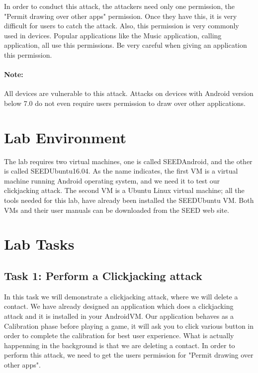 In order to conduct this attack, the attackers need only one permission, the "Permit drawing over other apps" permission.
Once they have this, it is very difficult for users to catch the attack. Also, this permission is very commonly used in devices. 
Popular applications like the Music application, calling application, all use this permissions. Be very careful when giving an 
application this permission.

\paragraph{Note:} All devices are vulnerable to this attack. Attacks on devices with Android version below 7.0 do not even require users permission to draw over other applications. 



\section{Lab Environment}

The lab requires two virtual machines, one is called SEEDAndroid, and the other is called
SEEDUbuntu16.04. As the name indicates, the first VM is a virtual machine running Android
operating system, and we need it to test our clickjacking attack. The second
VM is a Ubuntu Linux virtual machine; all the tools needed for
this lab, have already been installed the SEEDUbuntu VM. 
Both VMs and their user manuals can be downloaded from the SEED web site. 



\section{Lab Tasks}



\subsection{Task 1: Perform a Clickjacking attack}


In this task we will demonstrate a clickjacking attack, where we will delete a contact. We have already designed an
application which does a clickjacking attack and it is installed in your AndroidVM.
Our application behaves as a Calibration phase before playing a game, it will ask you to click various button in order to complete the 
calibration for best user experience. What is actually happenning in the background is that we are deleting a contact. In order to perform
this attack, we need to get the users permission for "Permit drawing over other apps". 


